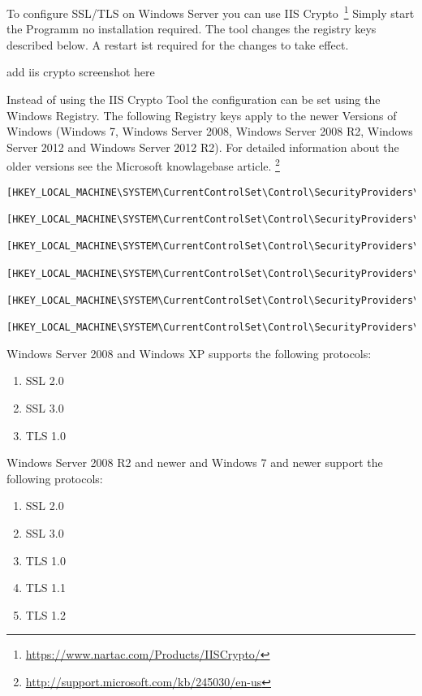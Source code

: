 To configure SSL/TLS on Windows Server you can use IIS Crypto~\footnote{\url{https://www.nartac.com/Products/IISCrypto/}}
Simply start the Programm no installation required. The tool changes the registry keys described below.
A restart ist required for the changes to take effect.

\todo add iis crypto screenshot here

Instead of using the IIS Crypto Tool the configuration can be set
using the Windows Registry. The following Registry keys apply to the
newer Versions of Windows (Windows 7, Windows Server 2008, Windows
Server 2008 R2, Windows Server 2012 and Windows Server 2012 R2). For detailed
information about the older versions see the Microsoft knowlagebase
article. \footnote{\url{http://support.microsoft.com/kb/245030/en-us}}
\begin{lstlisting}[breaklines]
  [HKEY_LOCAL_MACHINE\SYSTEM\CurrentControlSet\Control\SecurityProviders\Schannel] 
  [HKEY_LOCAL_MACHINE\SYSTEM\CurrentControlSet\Control\SecurityProviders\Schannel\Ciphers] 
  [HKEY_LOCAL_MACHINE\SYSTEM\CurrentControlSet\Control\SecurityProviders\Schannel\CipherSuites] 
  [HKEY_LOCAL_MACHINE\SYSTEM\CurrentControlSet\Control\SecurityProviders\Schannel\Hashes] 
  [HKEY_LOCAL_MACHINE\SYSTEM\CurrentControlSet\Control\SecurityProviders\Schannel\KeyExchangeAlgorithms] 
  [HKEY_LOCAL_MACHINE\SYSTEM\CurrentControlSet\Control\SecurityProviders\Schannel\Protocols] 
\end{lstlisting}

Windows Server 2008 and Windows XP supports the following protocols:
\begin{enumerate}
\item SSL 2.0
\item SSL 3.0
\item TLS 1.0
\end{enumerate}

Windows Server 2008 R2 and newer and Windows 7 and newer support the following protocols:
\begin{enumerate}
\item SSL 2.0
\item SSL 3.0
\item TLS 1.0
\item TLS 1.1
\item TLS 1.2
\end{enumerate}

